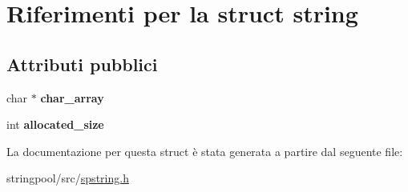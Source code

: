 \hypertarget{structstring}{
\section{Riferimenti per la struct string}
\label{structstring}
}
\subsection*{Attributi pubblici}
\begin{DoxyCompactItemize}
\item 
\hypertarget{structstring_acd450648098ba3eaf4db79064af67051}{
char $\ast$ {\bfseries char\_\-array}}
\label{structstring_acd450648098ba3eaf4db79064af67051}

\item 
\hypertarget{structstring_ac06bb82958ec7c45e2838ae575b124ec}{
int {\bfseries allocated\_\-size}}
\label{structstring_ac06bb82958ec7c45e2838ae575b124ec}

\end{DoxyCompactItemize}


La documentazione per questa struct è stata generata a partire dal seguente file:\begin{DoxyCompactItemize}
\item 
stringpool/src/\hyperlink{spstring_8h}{spstring.h}\end{DoxyCompactItemize}
